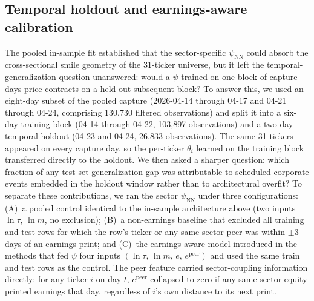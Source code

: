\subsection{Temporal holdout and earnings-aware calibration}\label{sec:earnings_holdout}

The pooled in-sample fit established that the sector-specific $\psi_{\text{NN}}$ could absorb the cross-sectional smile geometry of the 31-ticker universe, but it left the temporal-generalization question unanswered: would a $\psi$ trained on one block of capture days price contracts on a held-out subsequent block? To answer this, we used an eight-day subset of the pooled capture (2026-04-14 through 04-17 and 04-21 through 04-24, comprising 130{,}730 filtered observations) and split it into a six-day training block (04-14 through 04-22, 103{,}897 observations) and a two-day temporal holdout (04-23 and 04-24, 26{,}833 observations). The same 31 tickers appeared on every capture day, so the per-ticker $\theta_i$ learned on the training block transferred directly to the holdout. We then asked a sharper question: which fraction of any test-set generalization gap was attributable to scheduled corporate events embedded in the holdout window rather than to architectural overfit? To separate these contributions, we ran the sector $\psi_{\text{NN}}$ under three configurations: (A)~a pooled control identical to the in-sample architecture above (two inputs $\ln\tau,\,\ln m$, no exclusion); (B)~a non-earnings baseline that excluded all training and test rows for which the row's ticker or any same-sector peer was within $\pm 3$ days of an earnings print; and (C)~the earnings-aware model introduced in the methods that fed $\psi$ four inputs $(\ln\tau,\,\ln m,\,e,\,e^{\text{peer}})$ and used the same train and test rows as the control. The peer feature carried sector-coupling information directly: for any ticker $i$ on day $t$, $e^{\text{peer}}$ collapsed to zero if any same-sector equity printed earnings that day, regardless of $i$'s own distance to its next print.

